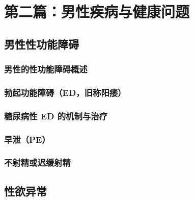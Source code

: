 \part*{第二篇：男性疾病与健康问题}

\chapter{男性性功能障碍}

\section{男性的性功能障碍概述}

\section{勃起功能障碍（ED，旧称阳痿）}

\section{糖尿病性 ED 的机制与治疗}

\section{早泄（PE）}

\section{不射精或迟缓射精}

\chapter{性欲异常}

